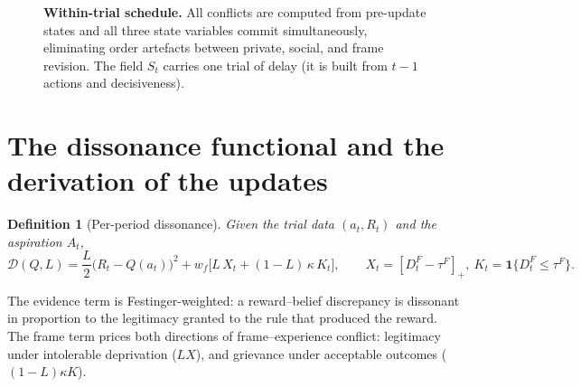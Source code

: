 \documentclass[11pt]{article}
\newtheorem{definition}{Definition}[section]
\newcommand{\1}{\mathbf{1}}
\begin{document}
\begin{figure}[H]
\centering
{}
\caption{\textbf{Within-trial schedule.} All conflicts are computed from pre-update states and all three state variables commit simultaneously, eliminating order artefacts between private, social, and frame revision. The field $S_t$ carries one trial of delay (it is built from $t-1$ actions and decisiveness).}
\label{fig:schedule}
\end{figure}

\section{The dissonance functional and the derivation of the updates}
\label{s:derivation}

\begin{definition}[Per-period dissonance]
Given the trial data $(a_t,R_t)$ and the aspiration $A_t$,
\begin{equation}
\mathcal D(Q,L)=\frac{L}{2}\big(R_t-Q(a_t)\big)^2+w_f\Big[L\,X_t+(1-L)\,\kappa\,K_t\Big],
\qquad X_t=[D^F_t-\tau^F]_+,\ K_t=\1\{D^F_t\le\tau^F\}.
\label{eq:D}
\end{equation}
\end{definition}
The evidence term is Festinger-weighted: a reward--belief discrepancy is dissonant in proportion to the legitimacy granted to the rule that produced the reward. The frame term prices both directions of frame--experience conflict: legitimacy under intolerable deprivation ($LX$), and grievance under acceptable outcomes ($(1-L)\kappa K$).
\end{document}
